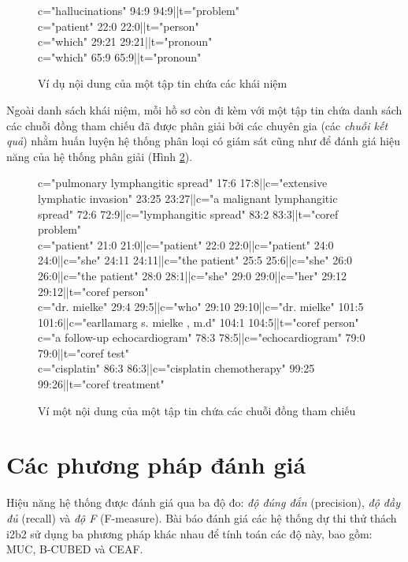 \begin{figure}[ht]
\begin{mdframed}
\ttfamily\footnotesize
\protect\raggedright
c="hallucinations" 94:9 94:9||t="problem"\\
c="patient" 22:0 22:0||t="person"\\
c="which" 29:21 29:21||t="pronoun"\\
c="which" 65:9 65:9||t="pronoun"
\end{mdframed}
\caption{Ví dụ nội dung của một tập tin chứa các khái niệm\label{con-eg}}
\end{figure}

Ngoài danh sách khái niệm, mỗi hồ sơ còn đi kèm với một tập tin chứa danh sách các chuỗi đồng tham chiếu đã được phân giải bởi các chuyên gia (các \emph{chuỗi kết quả}) nhằm huấn luyện hệ thống phân loại có giám sát cũng như để đánh giá hiệu năng của hệ thống phân giải (Hình \ref{chains-eg}).

\begin{figure}[ht]
\begin{mdframed}
\ttfamily\footnotesize
\protect\raggedright
c="pulmonary lymphangitic spread" 17:6 17:8||c="extensive lymphatic invasion" 23:25 23:27||c="a malignant lymphangitic spread" 72:6 72:9||c="lymphangitic spread" 83:2 83:3||t="coref problem"\\
c="patient" 21:0 21:0||c="patient" 22:0 22:0||c="patient" 24:0 24:0||c="she" 24:11 24:11||c="the patient" 25:5 25:6||c="she" 26:0 26:0||c="the patient" 28:0 28:1||c="she" 29:0 29:0||c="her" 29:12 29:12||t="coref person"\\
c="dr. mielke" 29:4 29:5||c="who" 29:10 29:10||c="dr. mielke" 101:5 101:6||c="earllamarg s. mielke , m.d" 104:1 104:5||t="coref person"\\
c="a follow-up echocardiogram" 78:3 78:5||c="echocardiogram" 79:0 79:0||t="coref test"\\
c="cisplatin" 86:3 86:3||c="cisplatin chemotherapy" 99:25 99:26||t="coref treatment"
\end{mdframed}
\caption{Ví một nội dung của một tập tin chứa các chuỗi đồng tham chiếu\label{chains-eg}}
\end{figure}

\section{Các phương pháp đánh giá}
Hiệu năng hệ thống được đánh giá qua ba độ đo: \emph{độ đúng đắn} (precision), \emph{độ đầy đủ} (recall) và \emph{độ F} (F-measure). Bài báo đánh giá các hệ thống dự thi thử thách i2b2 sử dụng ba phương pháp khác nhau để tính toán các độ này, bao gồm: MUC, B-CUBED và CEAF.

